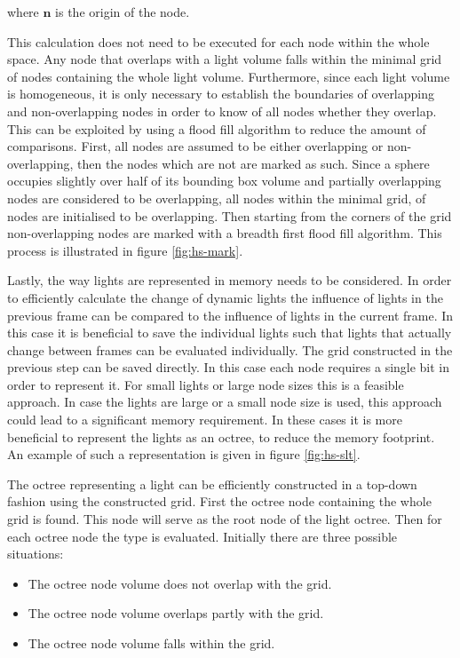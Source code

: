 \noindent where $\mathbf{n}$ is the origin of the node.

This calculation does not need to be executed for each node within the whole space. Any node that
overlaps with a light volume falls within the minimal grid of nodes containing the whole light
volume. Furthermore, since each light volume is homogeneous, it is only necessary to establish the boundaries
of overlapping and non-overlapping nodes in order to know of all nodes whether they overlap.
This can be exploited by using a flood fill algorithm to reduce the amount of comparisons.
First, all nodes are assumed to be either overlapping or non-overlapping, then the nodes which
are not are marked as such. Since a sphere occupies slightly over half of its bounding box
volume and partially overlapping nodes are considered to be overlapping, all nodes within
the minimal grid, of nodes are initialised to be overlapping. Then starting from the corners
of the grid non-overlapping nodes are marked with a breadth first flood fill algorithm.
This process is illustrated in figure \ref{fig:hs-mark}.


Lastly, the way lights are represented in memory needs to be considered. In order to efficiently
calculate the change of dynamic lights the influence of lights in the previous frame can be compared
to the influence of lights in the current frame. In this case it is beneficial to save the
individual lights such that lights that actually change between frames can be evaluated
individually. The grid constructed in the previous step can be saved directly. In this case
each node requires a single bit in order to represent it. For small lights or large node sizes
this is a feasible approach. In case the lights are large or a small node size is used, this
approach could lead to a significant memory requirement. In these cases it is more beneficial
to represent the lights as an octree, to reduce the memory footprint. An example of such a
representation is given in figure \ref{fig:hs-slt}.

The octree representing a light can be efficiently constructed in a top-down fashion using the
constructed grid. First the octree node containing the whole grid is found. This node will
serve as the root node of the light octree. Then for each octree node the type is evaluated.
Initially there are three possible situations:

\begin{itemize}
  \item The octree node volume does not overlap with the grid.
  \item The octree node volume overlaps partly with the grid.
  \item The octree node volume falls within the grid.
\end{itemize}

